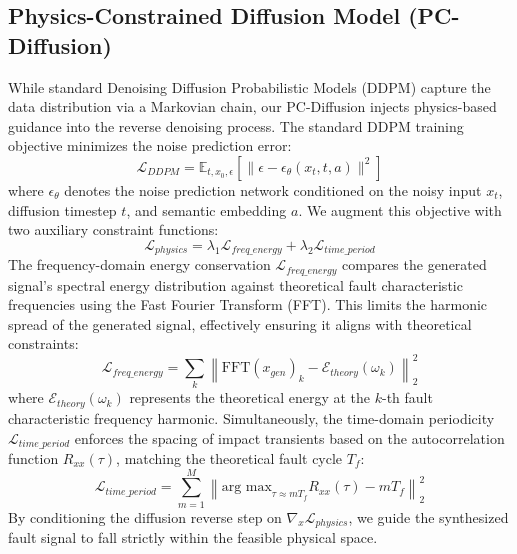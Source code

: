 \documentclass[journal]{IEEEtran}
\begin{document}
\subsection{Physics-Constrained Diffusion Model (PC-Diffusion)}
While standard Denoising Diffusion Probabilistic Models (DDPM) \cite{ho2020denoising} capture the data distribution via a Markovian chain, our PC-Diffusion injects physics-based guidance into the reverse denoising process. The standard DDPM training objective minimizes the noise prediction error:
\begin{equation}
    \mathcal{L}_{DDPM} = \mathbb{E}_{t, x_0, \epsilon} \left[ \| \epsilon - \epsilon_\theta(x_t, t, a) \|^2 \right]
    \label{eq:ddpm}
\end{equation}
where $\epsilon_\theta$ denotes the noise prediction network conditioned on the noisy input $x_t$, diffusion timestep $t$, and semantic embedding $a$. We augment this objective with two auxiliary constraint functions:
\begin{equation}
    \mathcal{L}_{physics} = \lambda_{1} \mathcal{L}_{freq\_energy} + \lambda_{2} \mathcal{L}_{time\_period}
\end{equation}
The frequency-domain energy conservation $\mathcal{L}_{freq\_energy}$ compares the generated signal's spectral energy distribution against theoretical fault characteristic frequencies using the Fast Fourier Transform (FFT). This limits the harmonic spread of the generated signal, effectively ensuring it aligns with theoretical constraints:
\begin{equation}
    \mathcal{L}_{freq\_energy} = \sum_{k} \left\| \text{FFT}(x_{gen})_k - \mathcal{E}_{theory}(\omega_k) \right\|_2^2
\end{equation}
where $\mathcal{E}_{theory}(\omega_k)$ represents the theoretical energy at the $k$-th fault characteristic frequency harmonic.
Simultaneously, the time-domain periodicity $\mathcal{L}_{time\_period}$ enforces the spacing of impact transients based on the autocorrelation function $R_{xx}(\tau)$, matching the theoretical fault cycle $T_f$:
\begin{equation}
    \mathcal{L}_{time\_period} = \sum_{m=1}^{M} \left\| \text{arg max}_{\tau \approx m T_f} R_{xx}(\tau) - m T_f \right\|_2^2
\end{equation}
By conditioning the diffusion reverse step on $\nabla_x \mathcal{L}_{physics}$, we guide the synthesized fault signal to fall strictly within the feasible physical space.
\end{document}
